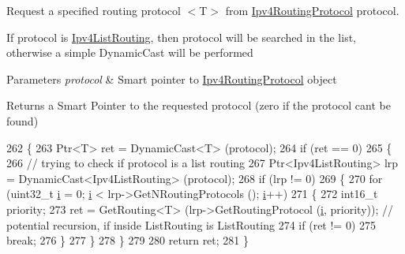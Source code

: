 Request a specified routing protocol $<$T$>$ from \hyperlink{classns3_1_1Ipv4RoutingProtocol}{Ipv4\+Routing\+Protocol} protocol. 

If protocol is \hyperlink{classns3_1_1Ipv4ListRouting}{Ipv4\+List\+Routing}, then protocol will be searched in the list, otherwise a simple Dynamic\+Cast will be performed


\begin{DoxyParams}{Parameters}
{\em protocol} & Smart pointer to \hyperlink{classns3_1_1Ipv4RoutingProtocol}{Ipv4\+Routing\+Protocol} object \\
\hline
\end{DoxyParams}
\begin{DoxyReturn}{Returns}
a Smart Pointer to the requested protocol (zero if the protocol can\textquotesingle{}t be found) 
\end{DoxyReturn}

\begin{DoxyCode}
262 \{
263   Ptr<T> ret = DynamicCast<T> (protocol);
264   \textcolor{keywordflow}{if} (ret == 0)
265     \{
266       \textcolor{comment}{// trying to check if protocol is a list routing}
267       Ptr<Ipv4ListRouting> lrp = DynamicCast<Ipv4ListRouting> (protocol);
268       \textcolor{keywordflow}{if} (lrp != 0)
269         \{
270           \textcolor{keywordflow}{for} (uint32\_t \hyperlink{bernuolliDistribution_8m_a6f6ccfcf58b31cb6412107d9d5281426}{i} = 0; \hyperlink{bernuolliDistribution_8m_a6f6ccfcf58b31cb6412107d9d5281426}{i} < lrp->GetNRoutingProtocols ();  \hyperlink{bernuolliDistribution_8m_a6f6ccfcf58b31cb6412107d9d5281426}{i}++)
271             \{
272               int16\_t priority;
273               ret = GetRouting<T> (lrp->GetRoutingProtocol (\hyperlink{bernuolliDistribution_8m_a6f6ccfcf58b31cb6412107d9d5281426}{i}, priority)); \textcolor{comment}{// potential recursion, if
       inside ListRouting is ListRouting}
274               \textcolor{keywordflow}{if} (ret != 0)
275                 \textcolor{keywordflow}{break};
276             \}
277         \}
278     \}
279 
280   \textcolor{keywordflow}{return} ret;
281 \}
\end{DoxyCode}
